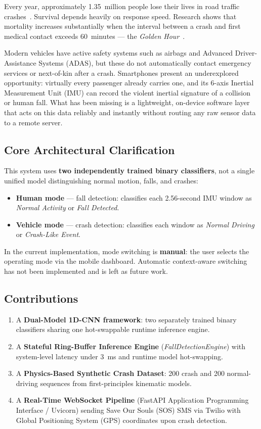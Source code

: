 \documentclass[12pt,a4paper]{article}
\begin{document}
Every year, approximately 1.35~million people lose their lives in road traffic
crashes~\citep{who_road_safety}. Survival depends heavily on response speed.
Research shows that mortality increases substantially when the interval between
a crash and first medical contact exceeds 60~minutes --- the \textit{Golden
Hour}~\citep{golden_hour}.

Modern vehicles have active safety systems such as airbags and Advanced
Driver-Assistance Systems (ADAS), but these do not automatically contact
emergency services or next-of-kin after a crash. Smartphones present an
underexplored opportunity: virtually every passenger already carries one,
and its 6-axis Inertial Measurement Unit (IMU) can record the violent
inertial signature of a collision or human fall. What has been missing is
a lightweight, on-device software layer that acts on this data reliably and
instantly without routing any raw sensor data to a remote server.

\subsection*{Core Architectural Clarification}

This system uses \textbf{two independently trained binary classifiers}, not
a single unified model distinguishing normal motion, falls, and crashes:
\begin{itemize}
  \item \textbf{Human mode} --- fall detection: classifies each 2.56-second
        IMU window as \textit{Normal Activity} or \textit{Fall Detected}.
  \item \textbf{Vehicle mode} --- crash detection: classifies each window as
        \textit{Normal Driving} or \textit{Crash-Like Event}.
\end{itemize}
In the current implementation, mode switching is \textbf{manual}: the user
selects the operating mode via the mobile dashboard. Automatic context-aware
switching has not been implemented and is left as future work.

\subsection*{Contributions}

\begin{enumerate}
  \item A \textbf{Dual-Model 1D-CNN framework}: two separately trained binary
        classifiers sharing one hot-swappable runtime inference engine.
  \item A \textbf{Stateful Ring-Buffer Inference Engine}
        (\textit{FallDetectionEngine}) with system-level latency under 3~ms
        and runtime model hot-swapping.
  \item A \textbf{Physics-Based Synthetic Crash Dataset}: 200 crash and
        200 normal-driving sequences from first-principles kinematic models.
  \item A \textbf{Real-Time WebSocket Pipeline} (FastAPI Application
        Programming Interface / Uvicorn) sending Save Our Souls (SOS) SMS via
        Twilio with Global Positioning System (GPS) coordinates upon crash
        detection.
\end{enumerate}
\end{document}
